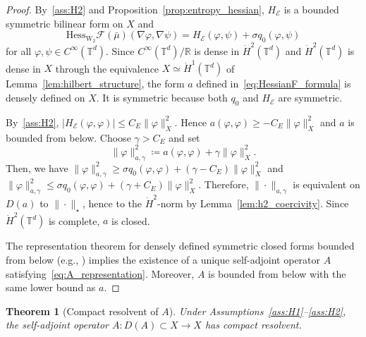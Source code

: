 \documentclass[11pt]{article}
\numberwithin{equation}{section}
\newtheorem{theorem}{Theorem}[section]
\theoremstyle{definition}
\newcommand{\R}{\mathbb{R}}
\newcommand{\T}{\mathbb{T}}
\newcommand{\F}{\mathcal{F}}
\newcommand{\E}{\mathcal{E}}
\newcommand{\Wtwo}{\operatorname{W}_2}
\newcommand{\dotHk}[1][k]{\dot{H}^{#1}}
\begin{document}
\begin{proof}
    By~\ref{ass:H2} and Proposition~\ref{prop:entropy_hessian}, $H_\E$ is a bounded symmetric bilinear form on $X$ and
    \[
    \mathrm{Hess}_{\Wtwo}\F(\bar\mu)(\nabla \varphi,\nabla \psi) = H_\E(\varphi,\psi) + \sigma q_0(\varphi,\psi)
    \]
    for all $\varphi, \psi \in C^\infty(\T^d)$.
    Since $C^\infty(\T^d)/\R$ is dense in $\dotHk[2](\T^d)$ and $\dotHk[2](\T^d)$ is dense in $X$ through the equivalence $X \simeq \dotHk[1](\T^d)$ of Lemma~\ref{lem:hilbert_structure}, the form $a$ defined in~\eqref{eq:HessianF_formula} is densely defined on $X$.
    It is symmetric because both $q_0$ and $H_\E$ are symmetric.

    By~\ref{ass:H2}, $|H_\E(\varphi,\varphi)| \le C_E\|\varphi\|_X^2$.
    Hence $a(\varphi,\varphi) \ge -C_E\|\varphi\|_X^2$ and $a$ is bounded from below.
    Choose $\gamma > C_E$ and set
    \[
    \|\varphi\|_{a,\gamma}^2 \coloneqq a(\varphi,\varphi) + \gamma\|\varphi\|_X^2.
    \]
    Then, we have $\|\varphi\|_{a,\gamma}^2 \ge \sigma q_0(\varphi,\varphi) + (\gamma-C_E)\|\varphi\|_X^2$ and $\|\varphi\|_{a,\gamma}^2 \le \sigma q_0(\varphi,\varphi) + (\gamma + C_E)\|\varphi\|_X^2$.
    Therefore, $\|\cdot\|_{a,\gamma}$ is equivalent on $D(a)$ to $\|\cdot\|_\star$, hence to the $\dotHk[2]$-norm by Lemma~\ref{lem:h2_coercivity}.
    Since $\dotHk[2](\T^d)$ is complete, $a$ is closed.

    The representation theorem for densely defined symmetric closed forms bounded from below (e.g., \cite[Ch.~VI, Thm.~2.6]{Kato1980}) implies the existence of a unique self-adjoint operator $A$ satisfying~\eqref{eq:A_representation}. 
    Moreover, $A$ is bounded from below with the same lower bound as $a$.
\end{proof}

\begin{theorem}[Compact resolvent of $A$]
    \label{thm:compact_resolvent_a}
    Under Assumptions~\ref{ass:H1}--\ref{ass:H2}, the self-adjoint operator $A : D(A) \subset X \to X$ has compact resolvent.
\end{theorem}
\end{document}
